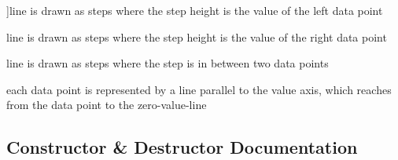 \begin{Desc}
\begin{description}
{}]line is drawn as steps where the step height is the value of the left data point \item[{\em 
ls\+Step\+Right\hypertarget{class_q_c_p_graph_ad60175cd9b5cac937c5ee685c32c0859afc3a655d34d56ee2a3a9d4969bf0a6b8}{}\label{class_q_c_p_graph_ad60175cd9b5cac937c5ee685c32c0859afc3a655d34d56ee2a3a9d4969bf0a6b8}
}]line is drawn as steps where the step height is the value of the right data point \item[{\em 
ls\+Step\+Center\hypertarget{class_q_c_p_graph_ad60175cd9b5cac937c5ee685c32c0859a9f7f3f66a811a18fe1b0a3e3a0928a73}{}\label{class_q_c_p_graph_ad60175cd9b5cac937c5ee685c32c0859a9f7f3f66a811a18fe1b0a3e3a0928a73}
}]line is drawn as steps where the step is in between two data points \item[{\em 
ls\+Impulse\hypertarget{class_q_c_p_graph_ad60175cd9b5cac937c5ee685c32c0859a9564511c68ac5c2d27146e8fd977335f}{}\label{class_q_c_p_graph_ad60175cd9b5cac937c5ee685c32c0859a9564511c68ac5c2d27146e8fd977335f}
}]each data point is represented by a line parallel to the value axis, which reaches from the data point to the zero-\/value-\/line \end{description}
\end{Desc}


\subsection{Constructor \& Destructor Documentation}

